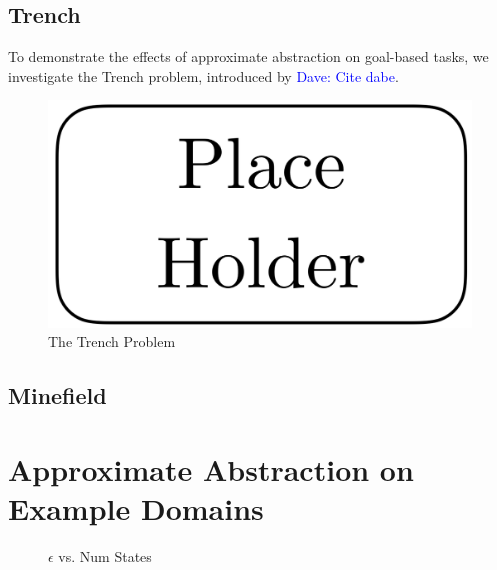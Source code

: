 \documentclass{article}
\newcommand\dnote[1]{\textcolor{blue}{Dave: #1}}
\begin{document}
\subsection{Trench}

To demonstrate the effects of approximate abstraction on goal-based tasks, we investigate the Trench problem, introduced by \dnote{Cite dabe}.



\begin{figure}[h]
\centering
\includegraphics[width=0.42\columnwidth]{figures/placeholder.png}
\caption{The Trench Problem}
\label{fig:trench}
\end{figure}

\subsection{Minefield}


\section{Approximate Abstraction on Example Domains}

\begin{figure}
\label{fig:eps-states}
\caption{$\epsilon$ vs. Num States}
\end{figure} 
\end{document}
